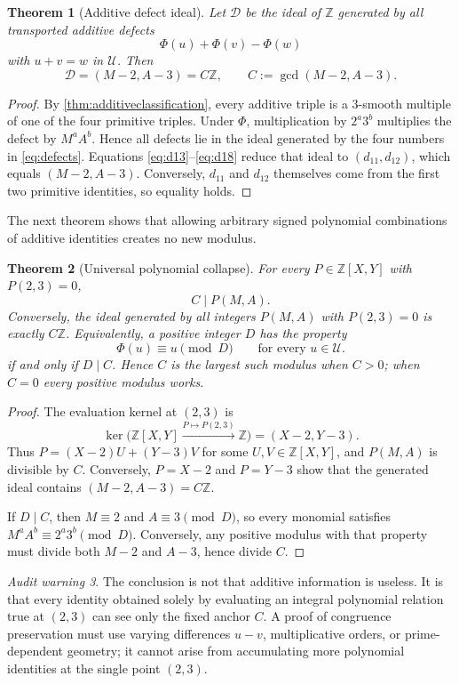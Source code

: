 \documentclass[11pt]{article}
\newtheorem{theorem}{Theorem}[section]
\theoremstyle{definition}
\theoremstyle{remark}
\newtheorem{warning}[theorem]{Audit warning}
\newcommand{\Z}{\mathbb{Z}}
\begin{document}
\begin{theorem}[Additive defect ideal]\label{thm:defectideal}
Let $\mathcal D$ be the ideal of $\Z$ generated by all transported additive defects
\[
       \Phi(u)+\Phi(v)-\Phi(w)
\]
with $u+v=w$ in $\mathcal U$.  Then
\[
       \mathcal D=(M-2,A-3)
       =C\Z,
       \qquad C:=\gcd(M-2,A-3).
       \tag{7.5}\label{eq:C}
\]
\end{theorem}
\begin{proof}
By \cref{thm:additiveclassification}, every additive triple is a $3$-smooth multiple of one
of the four primitive triples.  Under $\Phi$, multiplication by $2^a3^b$ multiplies the defect
by $M^aA^b$.  Hence all defects lie in the ideal generated by the four numbers in
\eqref{eq:defects}.  Equations \eqref{eq:d13}--\eqref{eq:d18} reduce that ideal to
$(d_{11},d_{12})$, which equals $(M-2,A-3)$.  Conversely, $d_{11}$ and $d_{12}$ themselves
come from the first two primitive identities, so equality holds.
\end{proof}

The next theorem shows that allowing arbitrary signed polynomial combinations of additive
identities creates no new modulus.

\begin{theorem}[Universal polynomial collapse]\label{thm:polycollapse}
For every $P\in\Z[X,Y]$ with $P(2,3)=0$,
\[
       C\mid P(M,A).
       \tag{7.6}\label{eq:polydiv}
\]
Conversely, the ideal generated by all integers $P(M,A)$ with $P(2,3)=0$ is exactly $C\Z$.
Equivalently, a positive integer $D$ has the property
\[
       \Phi(u)\equiv u\pmod D
       \qquad\text{for every }u\in\mathcal U.
       \tag{7.7}\label{eq:largestmod}
\]
if and only if $D\mid C$.  Hence $C$ is the largest such modulus when $C>0$; when $C=0$
every positive modulus works.
\end{theorem}
\begin{proof}
The evaluation kernel at $(2,3)$ is
\[
       \ker\bigl(\Z[X,Y]\xrightarrow{P\mapsto P(2,3)}\Z\bigr)
       =(X-2,Y-3).
\]
Thus $P=(X-2)U+(Y-3)V$ for some $U,V\in\Z[X,Y]$, and
$P(M,A)$ is divisible by $C$.  Conversely, $P=X-2$ and $P=Y-3$ show that the generated
ideal contains $(M-2,A-3)=C\Z$.

If $D\mid C$, then $M\equiv2$ and $A\equiv3\pmod D$, so every monomial satisfies
$M^aA^b\equiv2^a3^b\pmod D$.  Conversely, any positive modulus with that property must divide
both $M-2$ and $A-3$, hence divide $C$.
\end{proof}

\begin{warning}
The conclusion is not that additive information is useless.  It is that every identity obtained
solely by evaluating an integral polynomial relation true at $(2,3)$ can see only the fixed
anchor $C$.  A proof of congruence preservation must use varying differences $u-v$, multiplicative
orders, or prime-dependent geometry; it cannot arise from accumulating more polynomial identities
at the single point $(2,3)$.
\end{warning}
\end{document}
